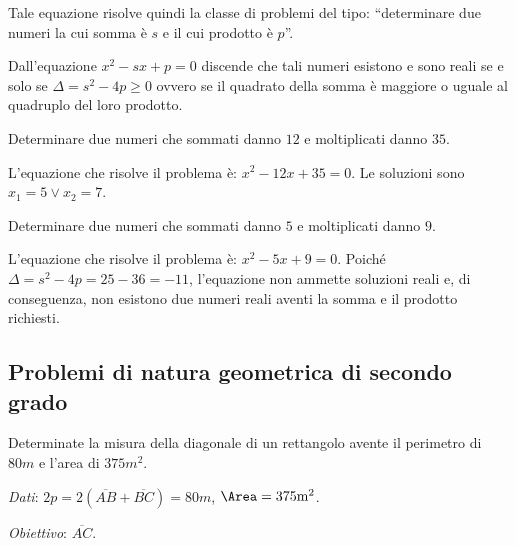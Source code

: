 Tale equazione risolve quindi la classe di problemi del tipo: ``determinare due numeri la cui somma è $s$ e il cui prodotto è $p$''.

Dall'equazione $x^{2} - s x + p = 0$ discende che tali numeri esistono e sono reali se e solo se $\Delta =s^{2}-4p\geq 0$ ovvero se il quadrato della somma è maggiore o uguale al quadruplo del loro prodotto.
\pagebreak
\begin{exrig}
\begin{esempio}
Determinare due numeri che sommati danno $12$ e moltiplicati danno $35$.

L'equazione che risolve il problema è: $x^{2} - 12 x + 35 = 0$. Le soluzioni sono $x_{1} = 5 \vee x_{2} = 7$.
\end{esempio}

\begin{esempio}
Determinare due numeri che sommati danno $5$ e moltiplicati danno $9$.

L'equazione che risolve il problema è: $x^{2} - 5 x + 9 = 0$. Poiché $\Delta = s^{2} - 4 p = 25 - 36 = - 11$, l'equazione non ammette soluzioni reali e, di conseguenza, non esistono due numeri reali aventi la somma e il prodotto richiesti.
\end{esempio}
\end{exrig}
\vspazio\ovalbox{\risolvii \ref{ese:3.77}, \ref{ese:3.78}, \ref{ese:3.79}, \ref{ese:3.80}}

\subsection{Problemi di natura geometrica di secondo grado}

\begin{problema}
Determinate la misura della diagonale di un rettangolo avente il perimetro di $80\unit{m}$ e l'area di $375\unit{m^2}$.
\end{problema}

\begin{center}
 
\end{center}

\emph{Dati}: $2p = 2(\overline{AB}+\overline{BC})= 80\unit{m}$, $\Area = 375\unit{m^2}$.

\emph{Obiettivo}: $\overline{AC}$.

